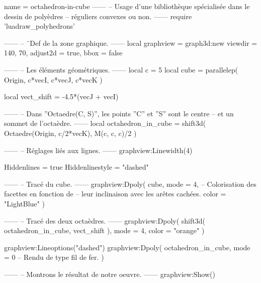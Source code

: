 \documentclass[border = 3pt]{standalone}
\begin{document}
\begin{luadraw*}{name = octahedron-in-cube}
------
-- Usage d'une bibliothèque spécialisée dans le dessin de polyèdres
-- réguliers convexes ou non.
------
require 'luadraw_polyhedrons'

------
-- ¨Def de la zone graphique.
------
local graphview = graph3d:new{
  viewdir = {140, 70},
  adjust2d = true,
  bbox     = false
}

------
-- Les éléments géométriques.
------
local c = 5
local cube = parallelep(
  Origin,
  c*vecI, c*vecJ, c*vecK
)

local vect_shift = -4.5*(vecJ + vecI)

------
-- Dans ''Octaedre(C, S)'', les points ''C'' et ''S'' sont le centre
-- et un sommet de l'octaèdre.
------
local octahedron_in_cube = shift3d(
  Octaedre(Origin, c/2*vecK),
  M(c, c, c)/2
)

------
-- Réglages liés aux lignes.
------
graphview:Linewidth(4)

Hiddenlines     = true
Hiddenlinestyle = "dashed"

------
-- Tracé du cube.
------
graphview:Dpoly(
  cube,
  {
    mode  = 4,  -- Colorisation des facettes en fonction de
                -- leur inclinaison avec les arêtes cachées.
    color = "LightBlue"
  }
)

------
-- Tracé des deux octaèdres.
------
graphview:Dpoly(
  shift3d(
    octahedron_in_cube,
    vect_shift
  ),
  {
    mode = 4,
    color = "orange"
  }
)

graphview:Lineoptions("dashed")
graphview:Dpoly(
  octahedron_in_cube,
  {
    mode = 0  -- Rendu de type fil de fer.
  }
)

------
-- Montrons le résultat de notre oeuvre.
------
graphview:Show()
\end{luadraw*}
\end{document}

